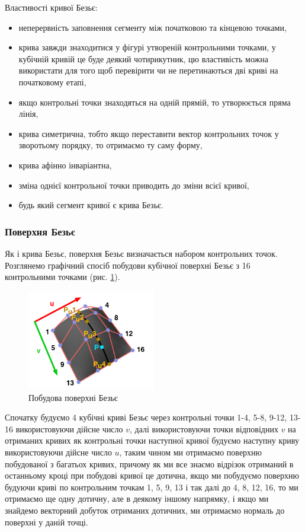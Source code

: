 \let\mypdfximage\pdfximage\def\pdfximage{\immediate\mypdfximage}\documentclass[14pt,a4paper]{extarticle}
\theoremstyle{definition}
\renewcommand{\[}{\begin{singlespace}\begin{equation*}}
\renewcommand{\]}{\end{equation*}\end{singlespace}}
\renewcommand{\+}{\discretionary{\mbox{\scriptsize$\hookleftarrow$}}{}{}}
\begin{document}
Властивості кривої Безьє:
\begin{itemize}
\item неперервність заповнення сегменту між початковою та кінцевою точками,
\item крива завжди знаходитися у фігурі утвореній контрольними точками, у кубічній кривій це буде деякий чотирикутник, цю властивість можна використати для того щоб перевірити чи не перетинаються дві криві на початковому етапі,
\item якщо контрольні точки знаходяться на одній прямій, то утворюється пряма лінія,
\item крива симетрична, тобто якщо переставити вектор контрольних точок у зворотьому порядку, то отримаємо ту саму форму,
\item крива афінно інваріантна,
\item зміна однієї контрольної точки приводить до зміни всієї кривої,
\item будь який сегмент кривої є крива Безьє.
\end{itemize}

\subsubsection{Поверхня Безьє}

Як і крива Безьє, поверхня Безьє визначається набором контрольних точок. Розглянемо графічний спосіб побудови кубічної поверхні Безьє з 16 контрольними точками (рис. \ref{fig:bezier-surface}). 

\begin{figure}[!htb]
    \centering
    \includegraphics[width=0.5\textwidth]{bezier-surface.png}
    \caption{Побудова поверхні Безьє}\label{fig:bezier-surface}
\end{figure}

Спочатку будуємо 4 кубічні криві Безьє через контрольні точки 1-4, 5-8, 9-12, 13-16 використовуючи дійсне число $v$, далі використовуючи точки відповідних $v$ на отриманих кривих як контрольні точки наступної кривої будуємо наступну криву використовуючи дійсне число $u$, таким чином ми отримаємо поверхню побудованої з багатьох кривих, причому як ми все знаємо відрізок отриманий в останньому кроці при побудові кривої це дотична, якщо ми побудуємо поверхню будуючи криві по контрольним точкам 1, 5, 9, 13 і так далі до 4, 8, 12, 16, то ми отримаємо ще одну дотичну, але в деякому іншому напрямку, і якщо ми знайдемо векторний добуток отриманих дотичних, ми отримаємо нормаль до поверхні у даній точці.
\end{document}
